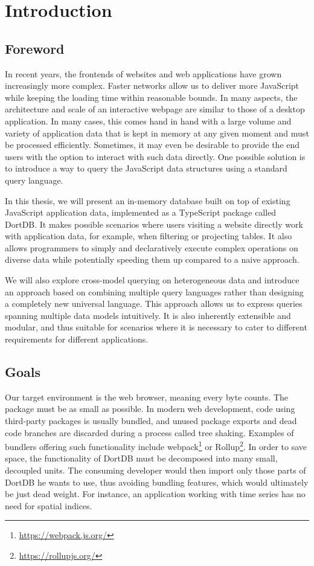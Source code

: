 \chapter*{Introduction}

\section*{Foreword}

In recent years, the frontends of websites and web applications have grown increasingly more complex. Faster networks allow us to deliver more JavaScript while keeping the loading time within reasonable bounds. In many aspects, the architecture and scale of an interactive webpage are similar to those of a desktop application. In many cases, this comes hand in hand with a large volume and variety of application data that is kept in memory at any given moment and must be processed efficiently. Sometimes, it may even be desirable to provide the end users with the option to interact with such data directly. One possible solution is to introduce a way to query the JavaScript data structures using a standard query language.

In this thesis, we will present an in-memory database built on top of existing JavaScript application data, implemented as a TypeScript package called DortDB. It makes possible scenarios where users visiting a website directly work with application data, for example, when filtering or projecting tables. It also allows programmers to simply and declaratively execute complex operations on diverse data while potentially speeding them up compared to a naive approach.

We will also explore cross-model querying on heterogeneous data and introduce an approach based on combining multiple query languages rather than designing a completely new universal language. This approach allows us to express queries spanning multiple data models intuitively. It is also inherently extensible and modular, and thus suitable for scenarios where it is necessary to cater to different requirements for different applications.

\section*{Goals}

Our target environment is the web browser, meaning every byte counts. The package must be as small as possible. In modern web development, code using third-party packages is usually bundled, and unused package exports and dead code branches are discarded during a process called tree shaking. Examples of bundlers offering such functionality include webpack\footnote{\url{https://webpack.js.org/}} or Rollup\footnote{\url{https://rollupjs.org/}}. In order to save space, the functionality of DortDB must be decomposed into many small, decoupled units. The consuming developer would then import only those parts of DortDB he wants to use, thus avoiding bundling features, which would ultimately be just dead weight. For instance, an application working with time series has no need for spatial indices.


